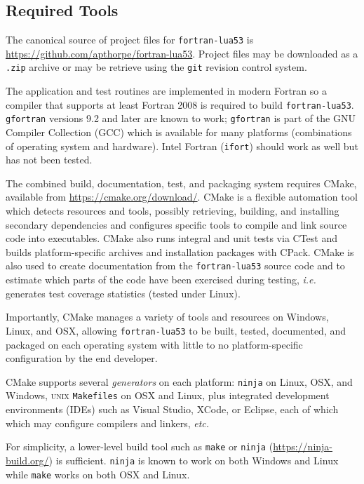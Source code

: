 \subsection{Required Tools}

The canonical source of project files for \texttt{fortran-lua53} is
\url{https://github.com/apthorpe/fortran-lua53}. Project files may be
downloaded as a \texttt{.zip} archive or may be retrieve using the
\texttt{git} revision control system.

The application and test routines are implemented in modern Fortran so
a compiler that supports at least Fortran 2008 is required to build
\texttt{fortran-lua53}. \texttt{gfortran} versions 9.2 and later are known to work;
\texttt{gfortran} is part of the GNU Compiler Collection (GCC) which is
available for many platforms (combinations of operating system and
hardware). Intel Fortran (\texttt{ifort}) should work as well but has
not been tested.

The combined build, documentation, test, and packaging system requires
CMake, available from \url{https://cmake.org/download/}. CMake is a
flexible automation tool which detects resources and tools, possibly
retrieving, building, and installing secondary dependencies and
configures specific tools to compile and link source code into
executables. CMake also runs integral and unit tests via CTest and builds
platform-specific archives and installation packages with CPack. CMake
is also used to create documentation from the \texttt{fortran-lua53} source code and
to estimate which parts of the code have been exercised
during testing, \textit{i.e.} generates test coverage statistics
(tested under Linux).

Importantly, CMake manages a variety of tools and resources on Windows,
Linux, and OSX, allowing \texttt{fortran-lua53} to be built, tested, documented, and
packaged on each operating system with little to no platform-specific
configuration by the end developer.

CMake supports several \emph{generators} on each platform: \texttt{ninja}
on Linux, OSX, and Windows, \textsc{unix} \texttt{Makefiles} on OSX and
Linux, plus integrated development environments (IDEs) such as Visual
Studio, XCode, or Eclipse, each of which which may configure compilers
and linkers, \textit{etc.}

For simplicity, a lower-level build tool such as \texttt{make} or
\texttt{ninja} (\url{https://ninja-build.org/}) is sufficient.
\texttt{ninja} is known to work on both Windows and Linux while
\texttt{make} works on both OSX and Linux.

